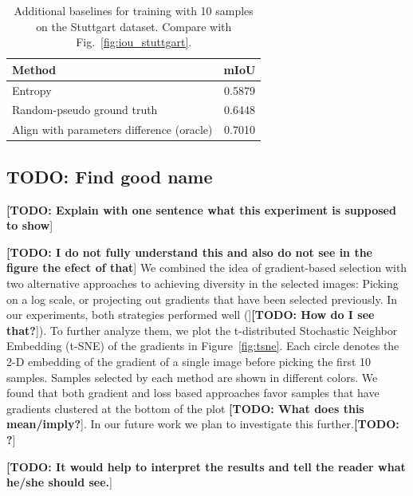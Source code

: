 \documentclass[letterpaper, 10 pt, conference]{ieeeconf}  %
\def\figref#1{Fig.~\ref{#1}}
\newcommand\todo[1]{\textbf{[TODO: #1}]}
\begin{document}
        \begin{table}
           \vspace{1em}
        \centering
        \caption{Additional baselines for training with 10 samples on the Stuttgart dataset. Compare with \figref{fig:iou_stuttgart}.}
        \begin{tabular}{@{}lc@{}} 
            \toprule
            Method  & mIoU \\ 
            \midrule 
             Entropy~\cite{chakraborty2015active, zhou2017fine} & 0.5879   \\ \addlinespace
    		  Random-pseudo ground truth   & 0.6448  \\ \addlinespace
    		  Align with parameters difference (oracle)  & 0.7010  \\  
            \bottomrule
        \end{tabular}
        \label{tab:add_baselines}
    \end{table}
    
    
    
\subsection{TODO: Find good name}

\todo{Explain with one sentence what this experiment is supposed to show}


\todo{I do not fully understand this and also do not see in the figure the efect of that}
We combined the idea of gradient-based selection with two alternative approaches to achieving diversity in the selected images: Picking on a log scale, or projecting out gradients that have been selected previously. In our experiments, both strategies performed well (]\todo{How do I see that?}). To further analyze them, we plot the t-distributed Stochastic Neighbor Embedding (t-SNE) of the gradients in Figure~\ref{fig:tsne}. Each circle denotes the 2-D embedding of the gradient of a single image before picking the first 10 samples. Samples selected by each method are shown in different colors. We found that both gradient and loss based approaches favor samples that have gradients clustered at the bottom of the plot \todo{What does this mean/imply?}. In our future work we plan to investigate this further.\todo{?}

\todo{It would help to interpret the results and tell the reader what he/she should see.}
\end{document}
